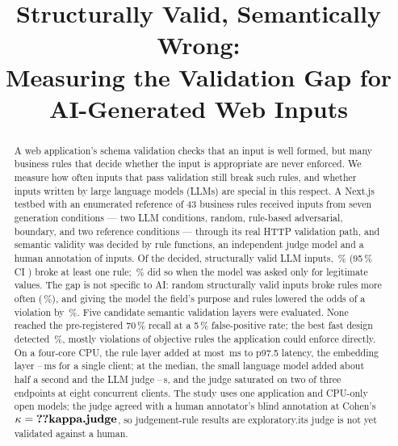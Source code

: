 \documentclass[conference]{IEEEtran}
\begin{document}
\title{Structurally Valid, Semantically Wrong:\\Measuring the Validation Gap for AI-Generated Web Inputs}

\author{
}

\maketitle

\begin{abstract}
A web application's schema validation checks that an input is well formed, but many business rules
that decide whether the input is appropriate are never enforced. We measure how often inputs that pass
validation still break such rules, and whether inputs written by large language models (LLMs) are
special in this respect. A Next.js testbed with an enumerated reference of 43 business rules received
 inputs from seven generation conditions --- two LLM conditions, random, rule-based
adversarial, boundary, and two reference conditions --- through its real HTTP validation path, and
semantic validity was decided by rule functions, an independent judge model\ifhumanlabels{} and a
human annotation of  inputs\fi. Of the decided,
structurally valid LLM inputs, \,\% (95\,\% CI ) broke at least one rule;
\,\% did so when the model was asked only for legitimate values. The gap is not
specific to AI: random structurally valid inputs broke rules more often (\,\%), and giving
the model the field's purpose and rules lowered the odds of a violation by \,\%.
Five candidate semantic validation layers were evaluated. None reached the pre-registered 70\,\% recall
at a 5\,\% false-positive rate; the best fast design detected \,\%, mostly
violations of objective rules the application could enforce directly.
On a four-core CPU, the rule layer added at most \,ms to p97.5 latency, the embedding
layer --\,ms for a single client; at the median, the small
language model added about half a second and the LLM judge --\,s,
and the judge saturated on two of three endpoints at eight concurrent clients.
The study uses one application and CPU-only open models; \ifhumanlabels the judge agreed with a human
annotator's blind annotation at Cohen's $\kappa=\R{kappa.judge}$\ifjudgeweak, so judgement-rule results
are exploratory\fi.\else its judge is not yet validated against a human.\fi
\end{abstract}
\end{document}
